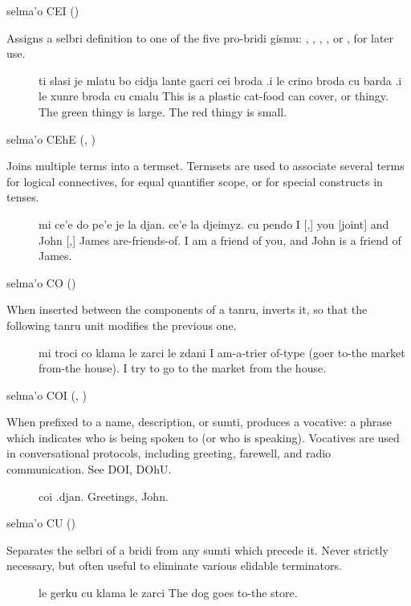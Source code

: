 selma'o CEI () 

Assigns a selbri definition to one of the five pro-bridi
    gismu: , , , , or
    , for later use.
\begin{description}
\item[] ti slasi je mlatu bo cidja lante gacri cei broda .i le crino broda cu barda .i le xunre broda cu cmalu This is a plastic cat-food can cover, or thingy. The green thingy is large. The red thingy is small.
\end{description}

selma'o CEhE (, ) 

Joins multiple terms into a termset. Termsets are used to
    associate several terms for logical connectives, for equal
    quantifier scope, or for special constructs in tenses.
\begin{description}
\item[] mi ce'e do pe'e je la djan. ce'e la djeimyz. cu pendo I [,] you [joint] and John [,] James are-friends-of. I am a friend of you, and John is a friend of James.
\end{description}

selma'o CO () 

When inserted between the components of a tanru, inverts it,
    so that the following tanru unit modifies the previous one.
\begin{description}
\item[] mi troci co klama le zarci le zdani I am-a-trier of-type (goer to-the market from-the house). I try to go to the market from the house.
\end{description}

selma'o COI (, ) 

When prefixed to a name, description, or sumti, produces a
    vocative: a phrase which indicates who is being spoken to (or
    who is speaking). Vocatives are used in conversational
    protocols, including greeting, farewell, and radio
    communication. See DOI, DOhU.
\begin{description}
\item[] coi .djan. Greetings, John.
\end{description}

selma'o CU () 

Separates the selbri of a bridi from any sumti which precede
    it. Never strictly necessary, but often useful to eliminate
    various elidable terminators.
\begin{description}
\item[] le gerku cu klama le zarci The dog goes to-the store.
\end{description}


